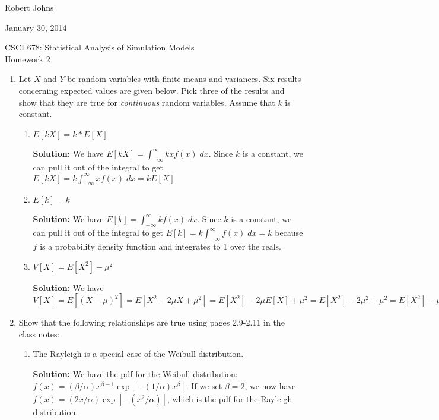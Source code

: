 \documentclass[11pt]{article} %
\begin{document}
\hfill Robert Johns

\hfill January 30, 2014

\begin{center} {\Large CSCI 678: Statistical Analysis of Simulation Models}\\{\large Homework 2}\end{center}

\begin{enumerate}

\item Let $X$ and $Y$ be random variables with finite means and variances.  Six results concerning expected values are given below.  Pick three of the results and show that they are true for \emph{continuous} random variables.  Assume that $k$ is constant.

\begin{enumerate}

\item $E[kX] = k * E[X]$

{\bf Solution:} We have $E[kX] = \int_{-\infty}^\infty kxf(x)\;dx$.  Since $k$ is a constant, we can pull it out of the integral to get $E[kX] = k\int_{-\infty}^\infty xf(x)\;dx = kE[X]$

\item $E[k] = k$

{\bf Solution:} We have $E[k] = \int_{-\infty}^\infty kf(x)\;dx$.  Since $k$ is a constant, we can pull it out of the integral to get $E[k] = k\int_{-\infty}^\infty f(x)\;dx = k$ because $f$ is a probability density function and integrates to 1 over the reals.

\setcounter{enumii}{3}
\item $V[X] = E[X^2] - \mu^2$

{\bf Solution:} We have $V[X] = E[(X - \mu)^2] = E[X^2 - 2\mu X + \mu^2] = E[X^2] - 2\mu E[X] + \mu^2 = E[X^2] - 2\mu^2 + \mu^2 = E[X^2] - \mu^2$

\end{enumerate}

\item Show that the following relationships are true using pages 2.9-2.11 in the class notes:

\begin{enumerate}

\item The Rayleigh is a special case of the Weibull distribution.

{\bf Solution:} We have the pdf for the Weibull distribution: $f(x) = (\beta/\alpha)x^{\beta - 1} \exp[-(1/\alpha)x^\beta]$.  If we set $\beta = 2$, we now have $f(x) = (2x/\alpha)\exp[-(x^2/\alpha)]$, which is the pdf for the Rayleigh distribution.


\end{enumerate}
\end{enumerate}
\end{document}
